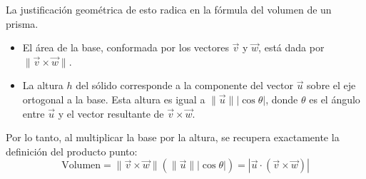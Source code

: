 La justificación geométrica de esto radica en la fórmula del volumen de un prisma. 
\begin{itemize}
    \item El área de la base, conformada por los vectores $\vec{v}$ y $\vec{w}$, está dada por $\|\vec{v} \times \vec{w}\|$.
    \item La altura $h$ del sólido corresponde a la componente del vector $\vec{u}$ sobre el eje ortogonal a la base. Esta altura es igual a $\|\vec{u}\||\cos\theta|$, donde $\theta$ es el ángulo entre $\vec{u}$ y el vector resultante de $\vec{v} \times \vec{w}$.
\end{itemize}

Por lo tanto, al multiplicar la base por la altura, se recupera exactamente la definición del producto punto:
\[ \text{Volumen} = \|\vec{v} \times \vec{w}\| (\|\vec{u}\| |\cos\theta|) = |\vec{u} \cdot (\vec{v} \times \vec{w})| \]

